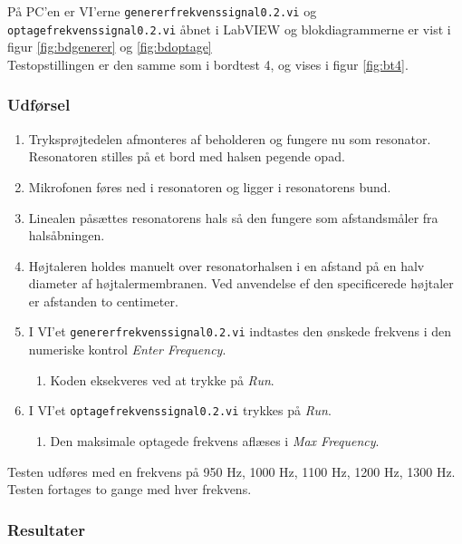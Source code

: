 		På PC'en er VI'erne \texttt{genererfrekvenssignal0.2.vi} og \texttt{optagefrekvenssignal0.2.vi} åbnet i LabVIEW og blokdiagrammerne er vist i figur \ref{fig:bdgenerer} og \ref{fig:bdoptage} \\ Testopstillingen er den samme som i bordtest 4, og vises i figur \ref{fig:bt4}.  
		

		\subsubsection{Udførsel}
			
			\begin{enumerate}
				\item Tryksprøjtedelen afmonteres af beholderen og fungere nu som resonator. Resonatoren stilles på et bord med halsen pegende opad. 
				\item Mikrofonen føres ned i resonatoren og ligger i resonatorens bund. 
				\item Linealen påsættes resonatorens hals så den fungere som afstandsmåler fra halsåbningen.
				\item Højtaleren holdes manuelt over resonatorhalsen i en afstand på en halv diameter af højtalermembranen. Ved anvendelse ef den specificerede højtaler er afstanden to centimeter. 
				\item I VI'et \texttt{genererfrekvenssignal0.2.vi} indtastes den ønskede frekvens i den numeriske kontrol \textit{Enter Frequency}. 
					\begin{enumerate}
						\item Koden eksekveres ved at trykke på \textit{Run}. 
					\end{enumerate} 
				\item I VI'et \texttt{optagefrekvenssignal0.2.vi} trykkes på \textit{Run}. 
					\begin{enumerate}
						\item Den maksimale optagede frekvens aflæses i \textit{Max Frequency}. 
					\end{enumerate}	 	
			\end{enumerate}
			
			Testen udføres med en frekvens på 950 Hz, 1000 Hz, 1100 Hz, 1200 Hz, 1300 Hz. Testen fortages to gange med hver frekvens.  
			
			\subsubsection{Resultater}
			
